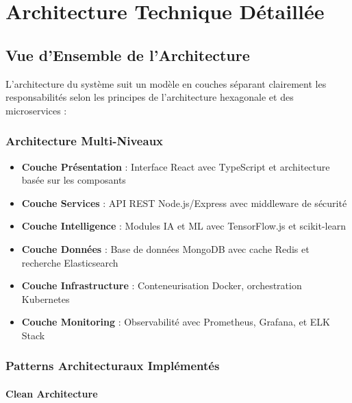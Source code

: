 \documentclass[12pt,a4paper]{report}
\begin{document}
\chapter{Architecture Technique Détaillée}

\section{Vue d'Ensemble de l'Architecture}

L'architecture du système suit un modèle en couches séparant clairement les responsabilités selon les principes de l'architecture hexagonale et des microservices :

\subsection{Architecture Multi-Niveaux}

\begin{itemize}
    \item \textbf{Couche Présentation} : Interface React avec TypeScript et architecture basée sur les composants
    \item \textbf{Couche Services} : API REST Node.js/Express avec middleware de sécurité
    \item \textbf{Couche Intelligence} : Modules IA et ML avec TensorFlow.js et scikit-learn
    \item \textbf{Couche Données} : Base de données MongoDB avec cache Redis et recherche Elasticsearch
    \item \textbf{Couche Infrastructure} : Conteneurisation Docker, orchestration Kubernetes
    \item \textbf{Couche Monitoring} : Observabilité avec Prometheus, Grafana, et ELK Stack
\end{itemize}

\subsection{Patterns Architecturaux Implémentés}

\subsubsection{Clean Architecture}
\end{document}
